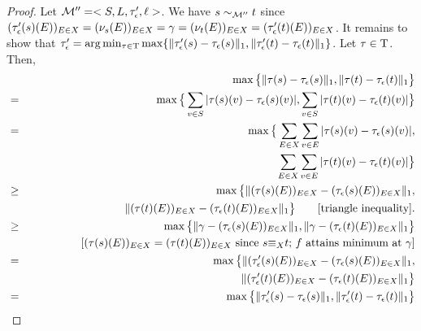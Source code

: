 \begin{proof}
Let $\mathcal{M}'' = <S, L, \tau_{\epsilon}', \ell>$. We have $s\sim_{\mathcal{M}''} t$ since $ (\tau_{\epsilon}'(s)(E))_{E \in X} =(\nu_s(E))_{E \in X} = \gamma = (\nu_t(E))_{E \in X} = (\tau_{\epsilon}'(t)(E))_{E \in  X}$.  It remains to show that $\tau_{\epsilon}'= \arg\min_{\tau \in {\rm T} } \max\{ \|\tau_{\epsilon}'(s) - \tau_{\epsilon}(s)\|_1 , \|\tau_{\epsilon}'(t) - \tau_{\epsilon}(t)\|_1\}$. Let $\tau \in {\rm T}$. Then,
\begin{eqnarray*} 
	&&\max\big\{\|\tau(s) -\tauHyp(s)\|_1, \|\tau(t) -\tauHyp(t)\|_1\big\} \\%
	&=& \max\big\{ \sum_{v \in S} |\tau(s)(v) -\tauHyp(s)(v)|, \sum_{v \in S} |\tau(t)(v)-\tauHyp(t)(v)|\big\}\\
	&=&\max\big\{\sum_{E \in X } \sum_{v \in E} |\tau(s)(v) -\tauHyp(s)(v)|, \\
	&& \phantom{\max;;}\sum_{E \in X } \sum_{v \in E} |\tau(t)(v)-\tauHyp(t)(v)|\big\}\\
	&\ge& \max\big\{\|(\tau(s)(E))_{E \in X} -(\tauHyp(s)(E))_{E \in X}\|_1 ,  \\
	&& \phantom{\max;;} \|(\tau(t)(E))_{E \in X} -(\tauHyp(t)(E))_{E \in X}\|_1\big\}\commenteq{triangle inequality}.\\
	&\ge& \max\big\{\|\gamma -(\tauHyp(s)(E))_{E \in X}\|_1 ,  \|\gamma-(\tauHyp(t)(E))_{E \in X}\|_1\big\}\\
	&& \phantom{\max;;} \commenteq{$(\tau(s)(E))_{E \in X}  = (\tau(t)(E))_{E \in X} $ since $s \mathord{\equiv_{X}} t$; $f$ attains minimum at $\gamma$}\\
	&=& \max\big\{\|(\tauHyp'(s)(E))_{E \in X} -(\tauHyp(s)(E))_{E \in X}\|_1, \\
	&& \phantom{\max;;} \|(\tauHyp'(t)(E))_{E \in X} -(\tauHyp(t)(E))_{E \in X}\|_1\big\}\\
	&=& \max\big\{\|\tauHyp'(s) -\tauHyp(s)\|_1, \|\tauHyp'(t) -\tauHyp(t)\|_1\big\} 
\end{eqnarray*}	
\end{proof}


\propositionAdjustTransitionFunction*

